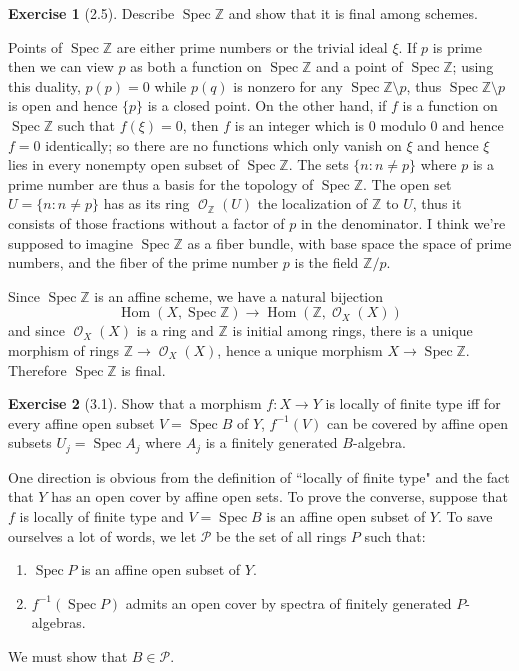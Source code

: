 \documentclass[10pt]{article}
\newcommand{\ZZ}{\mathbb{Z}}
\newcommand{\Hom}{\operatorname{Hom}}
\newcommand{\Spec}{\operatorname{Spec}}
\DeclareMathOperator{\Olo}{\mathscr O}
\theoremstyle{definition}
\newtheorem{exer}{Exercise}
\begin{document}
\begin{exer}[2.5]
Describe $\Spec \ZZ$ and show that it is final among schemes.
\end{exer}

Points of $\Spec \ZZ$ are either prime numbers or the trivial ideal $\xi$.
If $p$ is prime then we can view $p$ as both a function on $\Spec \ZZ$ and a point of $\Spec \ZZ$; using this duality, $p(p) = 0$ while $p(q)$ is nonzero for any $\Spec \ZZ \setminus p$, thus $\Spec \ZZ \setminus p$ is open and hence $\{p\}$ is a closed point.
On the other hand, if $f$ is a function on $\Spec \ZZ$ such that $f(\xi) = 0$, then $f$ is an integer which is $0$ modulo $0$ and hence $f = 0$ identically; so there are no functions which only vanish on $\xi$ and hence $\xi$ lies in every nonempty open subset of $\Spec \ZZ$.
The sets $\{n: n \neq p\}$ where $p$ is a prime number are thus a basis for the topology of $\Spec \ZZ$.
The open set $U = \{n: n \neq p\}$ has as its ring $\Olo_\ZZ(U)$ the localization of $\ZZ$ to $U$, thus it consists of those fractions without a factor of $p$ in the denominator.
I think we're supposed to imagine $\Spec \ZZ$ as a fiber bundle, with base space the space of prime numbers, and the fiber of the prime number $p$ is the field $\ZZ/p$.

Since $\Spec \ZZ$ is an affine scheme, we have a natural bijection
$$\Hom(X, \Spec \ZZ) \to \Hom(\ZZ, \Olo_X(X))$$
and since $\Olo_X(X)$ is a ring and $\ZZ$ is initial among rings, there is a unique morphism of rings $\ZZ \to \Olo_X(X)$, hence a unique morphism $X \to \Spec \ZZ$.
Therefore $\Spec \ZZ$ is final.

\begin{exer}[3.1]
Show that a morphism $f: X \to Y$ is locally of finite type iff for every affine open subset $V = \Spec B$ of $Y$, $f^{-1}(V)$ can be covered by affine open subsets $U_j = \Spec A_j$ where $A_j$ is a finitely generated $B$-algebra.
\end{exer}

One direction is obvious from the definition of ``locally of finite type" and the fact that $Y$ has an open cover by affine open sets.
To prove the converse, suppose that $f$ is locally of finite type and $V = \Spec B$ is an affine open subset of $Y$.
To save ourselves a lot of words, we let $\mathcal P$ be the set of all rings $P$ such that:
\begin{enumerate}
\item $\Spec P$ is an affine open subset of $Y$.
\item $f^{-1}(\Spec P)$ admits an open cover by spectra of finitely generated $P$-algebras.
\end{enumerate}
We must show that $B \in \mathcal P$.
\end{document}
